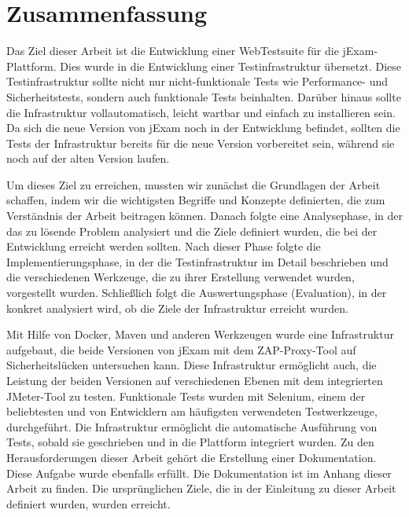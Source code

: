\section{Zusammenfassung}

Das Ziel dieser Arbeit ist die Entwicklung einer WebTestsuite für die jExam-Plattform.
Dies wurde in die Entwicklung einer Testinfrastruktur übersetzt. Diese Testinfrastruktur
sollte nicht nur nicht-funktionale Tests wie Performance- und Sicherheitstests, sondern
auch funktionale Tests beinhalten. Darüber hinaus sollte die Infrastruktur vollautomatisch,
leicht wartbar und einfach zu installieren sein. Da sich die neue Version von jExam noch in
der Entwicklung befindet, sollten die Tests der Infrastruktur bereits für die neue Version
vorbereitet sein, während sie noch auf der alten Version laufen.

Um dieses Ziel zu erreichen, mussten wir zunächst die Grundlagen der Arbeit schaffen,
indem wir die wichtigsten Begriffe und Konzepte definierten, die zum Verständnis der
Arbeit beitragen können. Danach folgte eine Analysephase, in der das zu lösende Problem
analysiert und die Ziele definiert wurden, die bei der Entwicklung erreicht werden sollten.
Nach dieser Phase folgte die Implementierungsphase, in der die Testinfrastruktur im Detail
beschrieben und die verschiedenen Werkzeuge, die zu ihrer Erstellung verwendet wurden,
vorgestellt wurden. Schließlich folgt die Auswertungsphase (Evaluation), in der konkret
analysiert wird, ob die Ziele der Infrastruktur erreicht wurden.

Mit Hilfe von Docker, Maven und anderen Werkzeugen wurde eine Infrastruktur aufgebaut,
die beide Versionen von jExam mit dem ZAP-Proxy-Tool auf Sicherheitslücken untersuchen
kann. Diese Infrastruktur ermöglicht auch, die Leistung der beiden Versionen auf
verschiedenen Ebenen mit dem integrierten JMeter-Tool zu testen. Funktionale Tests
wurden mit Selenium, einem der beliebtesten und von Entwicklern am häufigsten
verwendeten Testwerkzeuge, durchgeführt. Die Infrastruktur ermöglicht die automatische
Ausführung von Tests, sobald sie geschrieben und in die Plattform integriert wurden.
Zu den Herausforderungen dieser Arbeit gehört die Erstellung einer Dokumentation.
Diese Aufgabe wurde ebenfalls erfüllt. Die Dokumentation ist im Anhang dieser
Arbeit zu finden. Die ursprünglichen Ziele, die in der Einleitung zu dieser Arbeit
definiert wurden, wurden erreicht.
